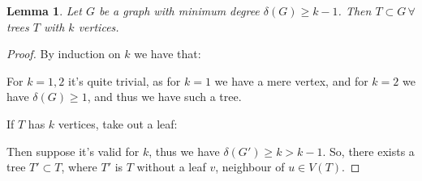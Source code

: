\documentclass[english]{IMTexam}
\newtheorem{lemma}{Lemma}
\begin{document}
\begin{questions}
\begin{solution}

			
			
			
			
			
			
			
			\begin{lemma}\label{lem:l2trees}
				Let $ G $ be a graph with minimum degree $ \delta(G)\geqslant k-1 $. Then $ T\subset G\,\forall $ trees $ T $ with $ k $ vertices.
			\end{lemma}
			
			\begin{proof}
				By induction on $ k $ we have that:
				
				For $ k=1,2 $ it's quite trivial, as for $ k=1 $ we have a mere vertex, and for $ k=2 $ we have $ \delta(G)\geqslant 1 $, and thus we have such a tree. %
				
				
				If $ T $ has $ k $ vertices, take out a leaf:
				
				
				Then suppose it's valid for $ k $, thus we have $ \delta(G')\geqslant k > k-1 $. So, there exists a tree $ T'\subset T $, where $ T' $ is $ T $ without a leaf $ v $, neighbour of $ u \in V(T) $.
				

\end{proof}
\end{solution}
\end{questions}
\end{document}
